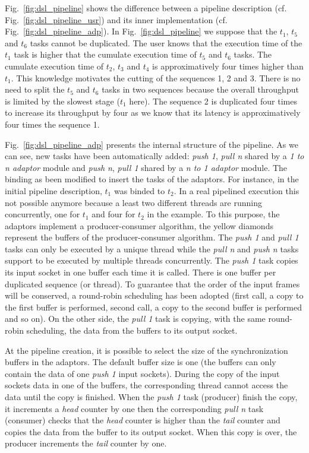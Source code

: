 Fig.~\ref{fig:dsl_pipeline} shows the difference between a pipeline description
(cf. Fig.~\ref{fig:dsl_pipeline_usr}) and its inner implementation (cf.
Fig.~\ref{fig:dsl_pipeline_adp}). In Fig.~\ref{fig:dsl_pipeline} we suppose
that the $t_1$, $t_5$ and $t_6$ tasks cannot be duplicated. The user knows that
the execution time of the $t_1$ task is higher that the cumulate execution time
of $t_5$ and $t_6$ tasks. The cumulate execution time of $t_2$, $t_3$ and $t_4$
is approximatively four times higher than $t_1$. This knowledge motivates the
cutting of the sequences 1, 2 and 3. There is no need to split the $t_5$ and
$t_6$ tasks in two sequences because the overall throughput is limited by the
slowest stage ($t_1$ here). The sequence 2 is duplicated four times to increase
its throughput by four as we know that its latency is approximatively four
times the sequence 1.

Fig.~\ref{fig:dsl_pipeline_adp} presents the internal structure of the pipeline.
As we can see, new tasks have been automatically added: \emph{push 1},
\emph{pull n} shared by a \emph{1 to n adaptor} module and \emph{push n},
\emph{pull 1} shared by a \emph{n to 1 adaptor} module. The binding as been
modified to insert the tasks of the adaptors. For instance, in the initial
pipeline description, $t_1$ was binded to $t_2$. In a real pipelined execution
this not possible anymore because a least two different threads are running
concurrently, one for $t_1$ and four for $t_2$ in the example. To this purpose,
the adaptors implement a producer-consumer algorithm, the yellow diamonds
represent the buffers of the producer-consumer algorithm. The \emph{push 1} and
\emph{pull 1} tasks can only be executed by a unique thread while the \emph{pull
n} and \emph{push n} tasks support to be executed by multiple threads
concurrently. The \emph{push 1} task copies its input socket in one buffer
each time it is called. There is one buffer per duplicated sequence (or thread).
To guarantee that the order of the input frames will be conserved, a round-robin
scheduling has been adopted (first call, a copy to the first buffer is
performed, second call, a copy to the second buffer is performed and so on). On
the other side, the \emph{pull 1} task is copying, with the same round-robin
scheduling, the data from the buffers to its output socket.

At the pipeline creation, it is possible to select the size of the
synchronization buffers in the adaptors. The default buffer size is one (the
buffers can only contain the data of one \emph{push 1} input sockets). During
the copy of the input sockets data in one of the buffers, the corresponding
thread cannot access the data until the copy is finished. When the \emph{push 1}
task (producer) finish the copy, it increments a \emph{head} counter by one then
the corresponding \emph{pull n} task (consumer) checks that the \emph{head}
counter is higher than the \emph{tail} counter and copies the data from the
buffer to its output socket. When this copy is over, the producer increments
the \emph{tail} counter by one.

